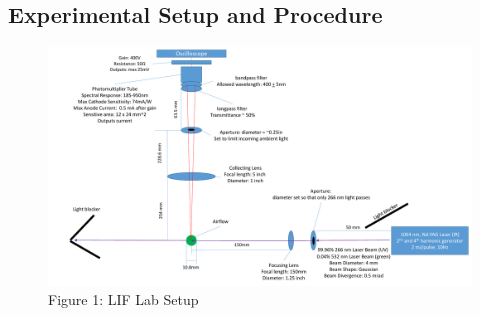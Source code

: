 \documentclass{article}
\begin{document}
\newpage
\begin{center}
    \section*{Experimental Setup and Procedure}
\end{center}

\begin{figure}[h]
    \centering
    \includegraphics[width=\linewidth]{Lab2Diagram.pdf}
    \caption*{{\footnotesize Figure 1: LIF Lab Setup}}
\end{figure}
\end{document}
